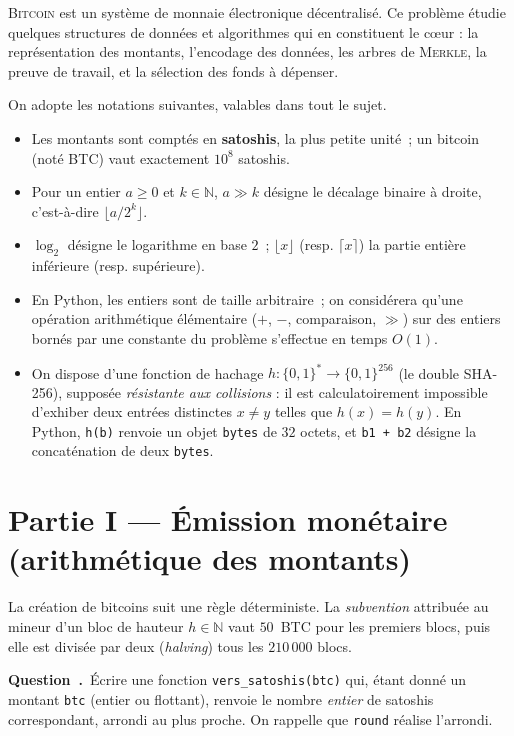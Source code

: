 \documentclass[11pt,a4paper]{article}
\newcounter{qcnt}
\newcommand{\Q}{\medskip\par\stepcounter{qcnt}\noindent\textbf{Question~\theqcnt.}~}
\newcommand{\code}[1]{\lstinline!#1!}
\begin{document}
\textsc{Bitcoin} est un système de monnaie électronique décentralisé. Ce problème étudie quelques structures de données et algorithmes qui en constituent le c\oe ur : la représentation des montants, l'encodage des données, les arbres de \textsc{Merkle}, la preuve de travail, et la sélection des fonds à dépenser.

\medskip
\noindent On adopte les notations suivantes, valables dans tout le sujet.
\begin{itemize}[nosep,leftmargin=1.4em]
  \item Les montants sont comptés en \textbf{satoshis}, la plus petite unité~; un bitcoin (noté \textsc{BTC}) vaut exactement $10^{8}$ satoshis.
  \item Pour un entier $a\ge 0$ et $k\in\mathbb{N}$, $a \gg k$ désigne le décalage binaire à droite, c'est-à-dire $\lfloor a/2^{k}\rfloor$.
  \item $\log_2$ désigne le logarithme en base $2$~; $\lfloor x\rfloor$ (resp. $\lceil x\rceil$) la partie entière inférieure (resp. supérieure).
  \item En Python, les entiers sont de taille arbitraire~; on considérera qu'une opération arithmétique élémentaire ($+$, $-$, comparaison, $\gg$) sur des entiers bornés par une constante du problème s'effectue en temps $O(1)$.
  \item On dispose d'une fonction de hachage $h : \{0,1\}^{*}\to\{0,1\}^{256}$ (le double \textsc{SHA-256}), supposée \emph{résistante aux collisions} : il est calculatoirement impossible d'exhiber deux entrées distinctes $x\neq y$ telles que $h(x)=h(y)$. En Python, \code{h(b)} renvoie un objet \code{bytes} de $32$ octets, et \code{b1 + b2} désigne la concaténation de deux \code{bytes}.
\end{itemize}

\section*{Partie I --- Émission monétaire (arithmétique des montants)}

La création de bitcoins suit une règle déterministe. La \emph{subvention} attribuée au mineur d'un bloc de hauteur $h\in\mathbb{N}$ vaut $50$~\textsc{BTC} pour les premiers blocs, puis elle est divisée par deux (\emph{halving}) tous les $210\,000$ blocs.

\Q Écrire une fonction \code{vers_satoshis(btc)} qui, étant donné un montant \code{btc} (entier ou flottant), renvoie le nombre \emph{entier} de satoshis correspondant, arrondi au plus proche. On rappelle que \code{round} réalise l'arrondi.
\end{document}
